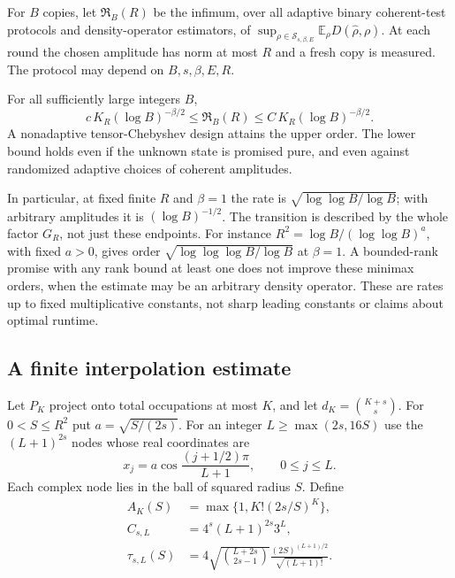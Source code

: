 For $B$ copies, let $\mathfrak R_B(R)$ be the infimum, over all adaptive
binary coherent-test protocols and density-operator estimators, of
$\sup_{\rho\in\mathcal S_{s,\beta,E}}\mathbb E_\rho D(\widehat\rho,\rho)$.
At each round the chosen amplitude has norm at most $R$ and a fresh copy is
measured. The protocol may depend on $B,s,\beta,E,R$.

\begin{theorem}
\label{thm:aperture-minimax}
For all sufficiently large integers $B$,
\[
 \boxed{\quad
 c\,K_R(\log B)^{-\beta/2}
 \le\mathfrak R_B(R)\le C\,K_R(\log B)^{-\beta/2}.
 \quad}
 \tag{A.3}\label{eq:aperture-minimax}
\]
A nonadaptive tensor-Chebyshev design attains the upper order. The lower
bound holds even if the unknown state is promised pure, and even against
randomized adaptive choices of coherent amplitudes.
\end{theorem}

In particular, at fixed finite $R$ and $\beta=1$ the rate is
$\sqrt{\log\log B/\log B}$; with arbitrary amplitudes it is
$(\log B)^{-1/2}$. The transition is described by the whole factor $G_R$,
not just these endpoints. For instance $R^2=\log B/(\log\log B)^a$, with
fixed $a>0$, gives order $\sqrt{\log\log\log B/\log B}$ at $\beta=1$.
A bounded-rank promise with any rank bound at least one does not improve
these minimax orders, when the estimate may be an arbitrary density operator.
These are rates up to fixed multiplicative constants, not sharp leading
constants or claims about optimal runtime.

\subsection{A finite interpolation estimate}
Let $P_K$ project onto total occupations at most $K$, and let
$d_K=\binom{K+s}{s}$. For $0<S\le R^2$ put $a=\sqrt{S/(2s)}$.
For an integer $L\ge\max(2s,16S)$ use the $(L+1)^{2s}$ nodes whose real
coordinates are
\[
 x_j=a\cos\frac{(j+1/2)\pi}{L+1},\qquad 0\le j\le L.
 \tag{A.4}\label{eq:aperture-nodes}
\]
Each complex node lies in the ball of squared radius $S$.
Define
\begin{align}
 A_K(S)&=\max\{1,K!(2s/S)^K\},\nonumber\\
 C_{s,L}&=4^s(L+1)^{2s}3^L,\nonumber\\
 \tau_{s,L}(S)&=4\sqrt{\binom{L+2s}{2s-1}}
                    \frac{(2S)^{(L+1)/2}}{\sqrt{(L+1)!}}.
 \tag{A.5}\label{eq:aperture-constants}
\end{align}

